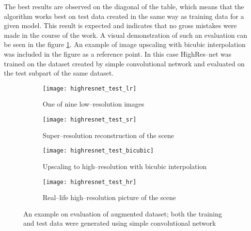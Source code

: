 The best results are observed on the diagonal of the table, which means that the algorithm works best on test data created in the same way as training data for a given model.
This result is expected and indicates that no gross mistakes were made in the course of the work.
A visual demonstration of such an evaluation can be seen in the figure \ref{fig:highresnet-test-visual}.
An example of image upscaling with bicubic interpolation was included in the figure as a reference point.
In this case HighRes--net was trained on the dataset created by simple convolutional network and evaluated on the test subpart of the same dataset.
\begin{figure}[p]
    \centering
    \begin{subfigure}[t]{0.45\textwidth}
        \centering
        \texttt{[image: highresnet\_test\_lr]}
        \caption{One of nine low--resolution images}
    \end{subfigure}
    \hfill
    \begin{subfigure}[t]{0.45\textwidth}
        \centering
        \texttt{[image: highresnet\_test\_sr]}
        \caption{Super--resolution reconstruction of the scene}
    \end{subfigure}
    \begin{subfigure}[t]{0.45\textwidth}
        \centering
        \texttt{[image: highresnet\_test\_bicubic]}
        \caption{Upscaling to high--resolution with bicubic interpolation}
    \end{subfigure}
    \hfill
    \begin{subfigure}[t]{0.45\textwidth}
        \centering
        \texttt{[image: highresnet\_test\_hr]}
        \caption{Real--life high--resolution picture of the scene}
    \end{subfigure}
    \caption{An example on evaluation of augmented dataset; both the training and test data were generated using simple convolutional network}
    \label{fig:highresnet-test-visual}
\end{figure}
